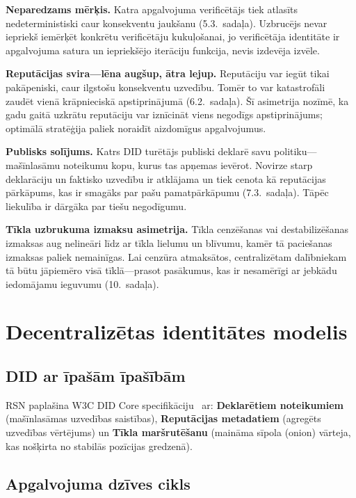 \documentclass[11pt,a4paper,twocolumn]{article}
\begin{document}
\textbf{Neparedzams mērķis.} Katra apgalvojuma verificētājs tiek atlasīts nedeterministiski caur konsekventu jaukšanu (5.3.\ sadaļa). Uzbrucējs nevar iepriekš iemērķēt konkrētu verificētāju kukuļošanai, jo verificētāja identitāte ir apgalvojuma satura un iepriekšējo iterāciju funkcija, nevis izdevēja izvēle.

\textbf{Reputācijas svira---lēna augšup, ātra lejup.} Reputāciju var iegūt tikai pakāpeniski, caur ilgstošu konsekventu uzvedību. Tomēr to var katastrofāli zaudēt vienā krāpnieciskā apstiprinājumā (6.2.\ sadaļa). Šī asimetrija nozīmē, ka gadu gaitā uzkrātu reputāciju var iznīcināt viens negodīgs apstiprinājums; optimālā stratēģija paliek noraidīt aizdomīgus apgalvojumus.

\textbf{Publisks solījums.} Katrs DID turētājs publiski deklarē savu politiku---mašīnlasāmu noteikumu kopu, kurus tas apņemas ievērot. Novirze starp deklarāciju un faktisko uzvedību ir atklājama un tiek cenota kā reputācijas pārkāpums, kas ir smagāks par pašu pamatpārkāpumu (7.3.\ sadaļa). Tāpēc liekulība ir dārgāka par tiešu negodīgumu.

\textbf{Tīkla uzbrukuma izmaksu asimetrija.} Tīkla cenzēšanas vai destabilizēšanas izmaksas aug nelineāri līdz ar tīkla lielumu un blīvumu, kamēr tā paciešanas izmaksas paliek nemainīgas. Lai cenzūra atmaksātos, centralizētam dalībniekam tā būtu jāpiemēro visā tīklā---prasot pasākumus, kas ir nesamērīgi ar jebkādu iedomājamu ieguvumu (10.\ sadaļa).

\section{Decentralizētas identitātes modelis}

\subsection{DID ar īpašām īpašībām}

RSN paplašina W3C DID Core specifikāciju~\cite{did2022} ar: \textbf{Deklarētiem noteikumiem} (mašīnlasāmas uzvedības saistības), \textbf{Reputācijas metadatiem} (agregēts uzvedības vērtējums) un \textbf{Tīkla maršrutēšanu} (maināma sīpola (onion) vārteja, kas nošķirta no stabilās pozīcijas gredzenā).

\subsection{Apgalvojuma dzīves cikls}
\end{document}
